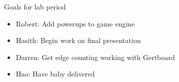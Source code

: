 \documentclass{beamer}
\begin{document}
\begin{frame}{Goals for lab period}
\begin{itemize}
    \item Robert: Add powerups to game engine
    \item Hasith: Begin work on final presentation
    \item Darren: Get edge counting working with Gertboard
    \item Hao: Have baby delivered
\end{itemize}
\end{frame}
\end{document}
